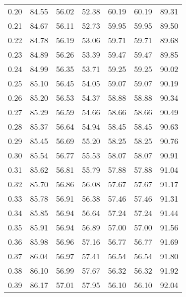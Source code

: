 \begin{tabular}{|c|c|c|c|c|c|c|}
      0.20 &     84.55 &     56.02 &      52.38 &   60.19 &      60.19 &         89.31 \\
      0.21 &     84.67 &     56.11 &      52.73 &   59.95 &      59.95 &         89.50 \\
      0.22 &     84.78 &     56.19 &      53.06 &   59.71 &      59.71 &         89.68 \\
      0.23 &     84.89 &     56.26 &      53.39 &   59.47 &      59.47 &         89.85 \\
      0.24 &     84.99 &     56.35 &      53.71 &   59.25 &      59.25 &         90.02 \\
      0.25 &     85.10 &     56.45 &      54.05 &   59.07 &      59.07 &         90.19 \\
      0.26 &     85.20 &     56.53 &      54.37 &   58.88 &      58.88 &         90.34 \\
      0.27 &     85.29 &     56.59 &      54.66 &   58.66 &      58.66 &         90.49 \\
      0.28 &     85.37 &     56.64 &      54.94 &   58.45 &      58.45 &         90.63 \\
      0.29 &     85.45 &     56.69 &      55.20 &   58.25 &      58.25 &         90.76 \\
      0.30 &     85.54 &     56.77 &      55.53 &   58.07 &      58.07 &         90.91 \\
      0.31 &     85.62 &     56.81 &      55.79 &   57.88 &      57.88 &         91.04 \\
      0.32 &     85.70 &     56.86 &      56.08 &   57.67 &      57.67 &         91.17 \\
      0.33 &     85.78 &     56.91 &      56.38 &   57.46 &      57.46 &         91.31 \\
      0.34 &     85.85 &     56.94 &      56.64 &   57.24 &      57.24 &         91.44 \\
      0.35 &     85.91 &     56.94 &      56.89 &   57.00 &      57.00 &         91.56 \\
      0.36 &     85.98 &     56.96 &      57.16 &   56.77 &      56.77 &         91.69 \\
      0.37 &     86.04 &     56.97 &      57.41 &   56.54 &      56.54 &         91.80 \\
      0.38 &     86.10 &     56.99 &      57.67 &   56.32 &      56.32 &         91.92 \\
      0.39 &     86.17 &     57.01 &      57.95 &   56.10 &      56.10 &         92.04 \\

\end{tabular}
